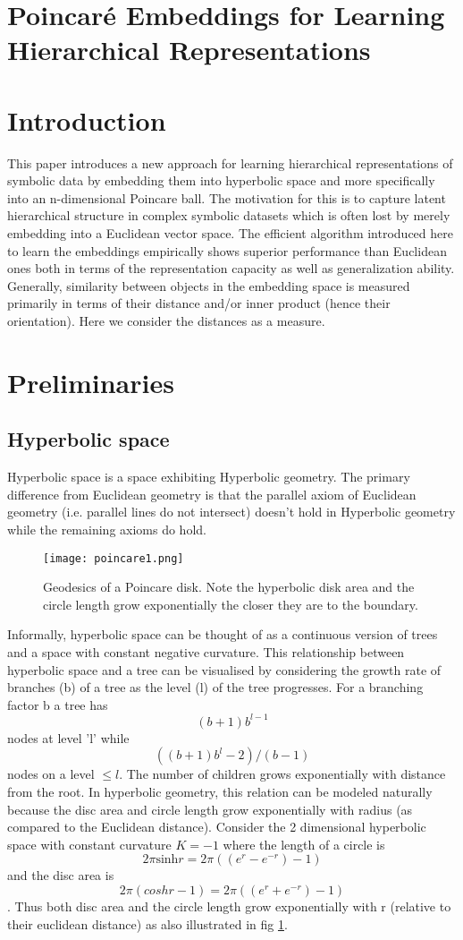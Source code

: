 \section{Poincar\'e Embeddings for Learning Hierarchical Representations}
\section{Introduction}
This paper introduces a new approach for learning hierarchical representations of symbolic data by embedding them into hyperbolic space and more specifically into an n-dimensional Poincare ball. The motivation for this is to capture latent hierarchical structure in complex symbolic datasets which is often lost by merely embedding into a Euclidean vector space. The efficient algorithm introduced here to learn the embeddings empirically shows superior performance than Euclidean ones both in terms of the representation capacity as well as generalization ability. 
\\ Generally, similarity between objects in the embedding space is measured primarily in terms of their distance and/or inner product (hence their orientation). Here we consider the distances as a measure. 
\section{Preliminaries}
\subsection{Hyperbolic space}
Hyperbolic space is a space exhibiting Hyperbolic geometry. The primary difference from Euclidean geometry is that the parallel axiom of Euclidean geometry (i.e. parallel lines do not intersect) doesn't hold in Hyperbolic geometry while the remaining axioms do hold.
\begin{figure}
    \centering
    \texttt{[image: poincare1.png]}
    \caption{Geodesics of a Poincare disk. Note the hyperbolic disk area and the circle length grow exponentially the closer they are to the boundary. }
    \label{hyperb-tree}
\end{figure}
Informally, hyperbolic space can be thought of as a continuous version of trees and a space with constant negative curvature. This relationship between hyperbolic space and a tree can be visualised by considering the growth rate of branches (b) of a tree as the level (l) of the tree progresses. For a branching factor b a tree has $$(b+1)b^{l-1}$$ nodes at level 'l' while $$((b+1)b^l-2)/(b-1)$$ nodes on a level $\leq l$. The number of children grows exponentially with distance from the root. In hyperbolic geometry, this relation can be modeled naturally because the disc area and circle length grow exponentially with radius (as compared to the Euclidean distance). Consider the 2 dimensional hyperbolic space with constant curvature $K=-1$ where the length of a circle is $$2 \pi \text{sinh} r = 2 \pi ((e^r - e^{-r})-1)$$ and the disc area is $$2 \pi (cosh r -1) =2 \pi ((e^r + e^{-r})-1)$$. Thus both disc area and the circle length grow exponentially with r (relative to their euclidean distance) as also illustrated in fig \ref{hyperb-tree}.
